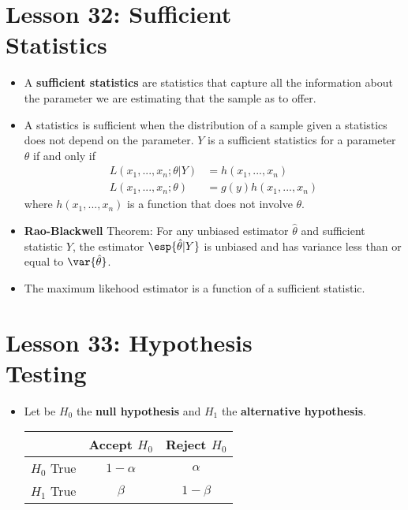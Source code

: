 \documentclass[10pt, french]{article}
\begin{document}
\begin{multicols*}{3}
\section*{Lesson 32: Sufficient \\ Statistics}
\begin{itemize}[align=left,leftmargin=*]
    \item A \textbf{sufficient statistics} are statistics that capture all the information about the parameter we are estimating that the sample as to offer.
    \item A statistics is sufficient when the distribution of a sample given a statistics does not depend on the parameter. $Y$ is a sufficient statistics for a parameter $\theta$ if and only if
    \begin{align*}
        L(x_1,...,x_n;\theta|Y) &= h(x_1,...,x_n) \\
        L(x_1,...,x_n;\theta)&= g(y)h(x_1,...,x_n)
    \end{align*}
    where $h(x_1,...,x_n)$ is a function that does not involve $\theta$.
    \item \textbf{Rao-Blackwell} Theorem: For any unbiased estimator $\hat{\theta}$ and sufficient statistic $Y$, the estimator $\esp{\hat{\theta}|Y}$ is unbiased and has variance less than or equal to $\var{\hat{\theta}}$.
    \item The maximum likehood estimator is a function of a sufficient statistic.
\end{itemize}

\section*{Lesson 33: Hypothesis \\ Testing}
\begin{itemize}[align=left,leftmargin=*]
  \item
  \begin{flushleft}
    Let be $H_0$ the \textbf{null hypothesis} and $H_1$ the \textbf{alternative hypothesis}.
  \end{flushleft}
  \begin{tabular}{ccc}
    \hline
    & Accept $H_0$ & Reject $H_0$ \\
    \hline
    $H_0$ True &  $1 - \alpha$ & $\alpha$ \\
    $H_1$ True & $\beta$ & $1-\beta$ \\
    \hline
  \end{tabular}

\end{itemize}
\end{multicols*}
\end{document}

